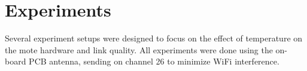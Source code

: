 \chapter{Experiments}

Several experiment setups were designed to focus on the effect of temperature on the mote hardware and link quality.
All experiments were done using the on-board PCB antenna, sending on channel 26 to minimize WiFi interference.





